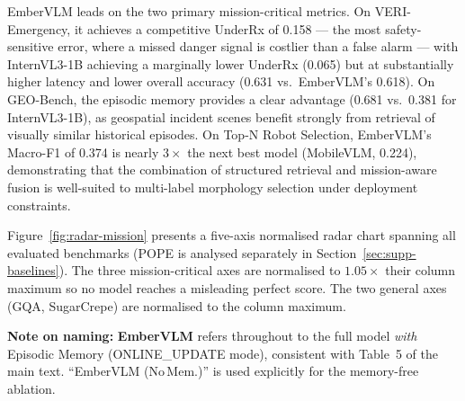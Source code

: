 \documentclass[runningheads]{llncs}
\begin{document}
EmberVLM leads on the two primary mission-critical metrics. On VERI-Emergency, it achieves
a competitive UnderRx of 0.158 — the most safety-sensitive error, where a missed danger
signal is costlier than a false alarm — with InternVL3-1B achieving a marginally lower
UnderRx (0.065) but at substantially higher latency and lower overall accuracy (0.631
vs.\ EmberVLM's 0.618). On GEO-Bench,
the episodic memory provides a clear advantage (0.681 vs.\ 0.381 for InternVL3-1B),
as geospatial incident scenes benefit strongly from retrieval of visually similar
historical episodes. On Top-N Robot Selection, EmberVLM's Macro-F1 of 0.374 is
nearly $3\times$ the next best model (MobileVLM, 0.224), demonstrating that the
combination of structured retrieval and mission-aware fusion is well-suited
to multi-label morphology selection under deployment constraints.

Figure~\ref{fig:radar-mission} presents a five-axis normalised radar chart spanning
all evaluated benchmarks (POPE is analysed separately in
Section~\ref{sec:supp-baselines}). The three mission-critical axes are normalised
to $1.05\times$ their column maximum so no model reaches a misleading perfect score.
The two general axes (GQA, SugarCrepe) are normalised to the column maximum.

\noindent\textbf{Note on naming:} \textbf{EmberVLM} refers throughout to the full
model \textit{with} Episodic Memory (ONLINE\_UPDATE mode), consistent with
Table~5 of the main text. ``EmberVLM (No\,Mem.)'' is used explicitly for the
memory-free ablation.
\end{document}
